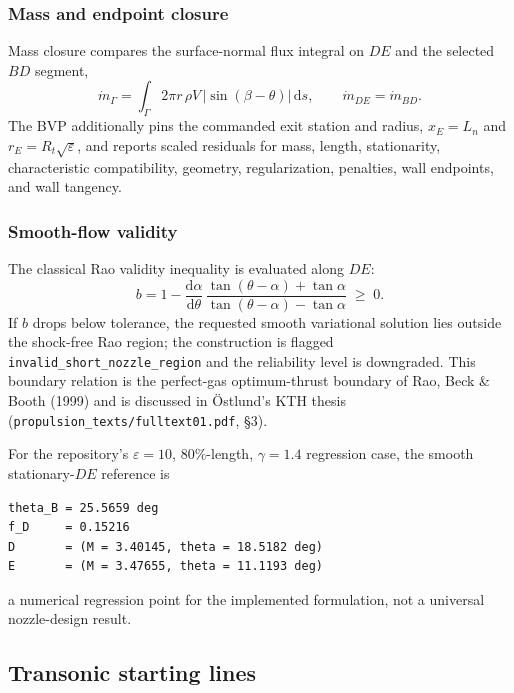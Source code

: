 \documentclass[11pt]{article}
\newcommand{\code}[1]{\texttt{#1}}
\begin{document}
\subsubsection{Mass and endpoint closure}

Mass closure compares the surface-normal flux integral on $DE$ and the
selected $BD$ segment,
\begin{equation}
\dot m_\Gamma=\int_\Gamma 2\pi r\,\rho V\,\left|\sin(\beta-\theta)\right|\,\mathrm{d}s,
\qquad
\dot m_{DE}=\dot m_{BD} .
\end{equation}
The BVP additionally pins the commanded exit station and radius, $x_E=L_n$
and $r_E=R_t\sqrt{\varepsilon}$, and reports scaled residuals for mass,
length, stationarity, characteristic compatibility, geometry, regularization,
penalties, wall endpoints, and wall tangency.

\subsubsection{Smooth-flow validity}

The classical Rao validity inequality is evaluated along $DE$:
\begin{equation}
b=1-\frac{\mathrm{d}\alpha}{\mathrm{d}\theta}\,
\frac{\tan(\theta-\alpha)+\tan\alpha}{\tan(\theta-\alpha)-\tan\alpha}\;\ge\;0 .
\end{equation}
If $b$ drops below tolerance, the requested smooth variational solution lies
outside the shock-free Rao region; the construction is flagged
\code{invalid\_short\_nozzle\_region} and the reliability level is
downgraded. This boundary relation is the perfect-gas optimum-thrust boundary
of Rao, Beck \& Booth (1999) and is discussed in \"Ostlund's KTH thesis
(\code{propulsion\_texts/fulltext01.pdf}, \S3).

For the repository's $\varepsilon=10$, $80\%$-length, $\gamma=1.4$ regression
case, the smooth stationary-$DE$ reference is
\begin{lstlisting}
theta_B = 25.5659 deg
f_D     = 0.15216
D       = (M = 3.40145, theta = 18.5182 deg)
E       = (M = 3.47655, theta = 11.1193 deg)
\end{lstlisting}
a numerical regression point for the implemented formulation, not a universal
nozzle-design result.

\subsection{Transonic starting lines}
\end{document}
